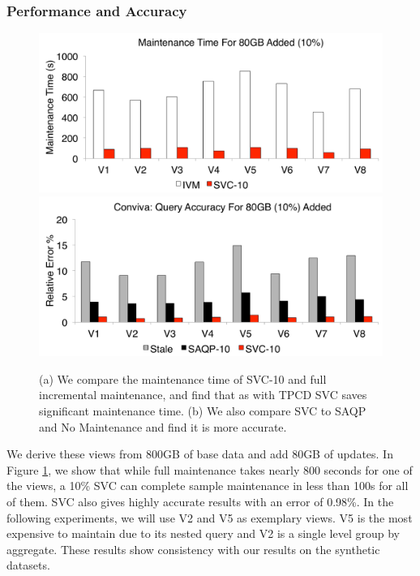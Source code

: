 \subsubsection{Performance and Accuracy}
\begin{figure}[t]
\centering
 \includegraphics[scale=0.20]{exp/con_2.pdf}
 \includegraphics[scale=0.20]{exp/con_1.pdf}
 \caption{(a) We compare the maintenance time of SVC-10 and full incremental maintenance, and find that as with TPCD SVC saves significant maintenance time. (b) We also compare SVC to SAQP and No Maintenance and find it is more accurate. \label{conv-1}}
\end{figure}
We derive these views from 800GB of base data and add 80GB of updates.
In Figure \ref{conv-1}, we show that while full maintenance takes nearly 800 seconds for one of the views, a 10\% SVC can complete sample maintenance in less than 100s for all of them.
SVC also gives highly accurate results with an error of 0.98\%.
In the following experiments, we will use V2 and V5 as exemplary views.
V5 is the most expensive to maintain due to its nested query and V2 is a single level group by aggregate.
These results show consistency with our results on the synthetic datasets.

